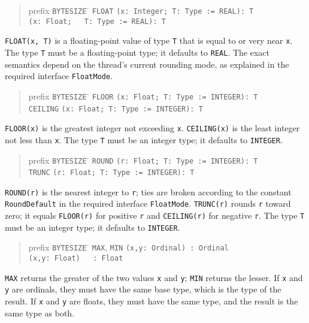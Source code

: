 \documentclass[10pt]{article}
\begin{document}
\begin{quote}
  \begin{tabbing}
    prefix \= \verb|BYTESIZE| \= \kill
           \> \verb|FLOAT|   \> \verb|(x: Integer; T: Type := REAL): T| \\
           \>                \> \verb|(x: Float;   T: Type := REAL): T|
  \end{tabbing}
\end{quote}
\verb|FLOAT(x, T)| is a floating-point value of type \verb|T| that is equal to
or very near \verb|x|.  The type \verb|T| must be a floating-point type; it
defaults to \verb|REAL|.  The exact semantics depend on the thread's current
rounding mode, as explained in the required interface \verb|FloatMode|.

\begin{quote}
  \begin{tabbing}
    prefix \= \verb|BYTESIZE| \= \kill
           \> \verb|FLOOR|   \> \verb|(x: Float; T: Type := INTEGER): T| \\
           \> \verb|CEILING| \> \verb|(x: Float; T: Type := INTEGER): T|
  \end{tabbing}
\end{quote}
\verb|FLOOR(x)| is the greatest integer not exceeding \verb|x|.
\verb|CEILING(x)| is the least integer not less than \verb|x|.
The type \verb|T| must be an integer type; it defaults to \verb|INTEGER|.

\begin{quote}
  \begin{tabbing}
    prefix \= \verb|BYTESIZE| \= \kill
           \> \verb|ROUND|   \> \verb|(r: Float; T: Type := INTEGER): T| \\
           \> \verb|TRUNC|   \> \verb|(r: Float; T: Type := INTEGER): T|
  \end{tabbing}
\end{quote}
\verb|ROUND(r)| is the nearest integer to \verb|r|; ties are broken according
to the constant \verb|RoundDefault| in the required interface
\verb|FloatMode|.  \verb|TRUNC(r)| rounds \verb|r| toward zero; it equals
\verb|FLOOR(r)| for positive \verb|r| and \verb|CEILING(r)| for negative
\verb|r|.
The type \verb|T| must be an integer type; it defaults to \verb|INTEGER|.

\begin{quote}
  \begin{tabbing}
    prefix \= \verb|BYTESIZE| \= \kill
           \> \verb|MAX|, \verb|MIN| \> \verb|(x,y: Ordinal) : Ordinal| \\
           \>                        \> \verb|(x,y: Float)   : Float|
  \end{tabbing}
\end{quote}
\verb|MAX| returns the greater of the two values \verb|x| and \verb|y|;
\verb|MIN| returns the lesser.  If \verb|x| and \verb|y| are ordinals, they
must have the same base type, which is the type of the result.  If \verb|x|
and \verb|y| are floats, they must have the same type, and the result is the
same type as both.
\end{document}

